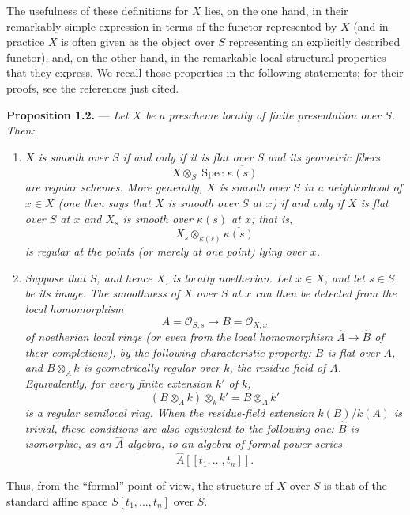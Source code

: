 The usefulness of these definitions for \(X\) lies, on the one hand,
in their remarkably simple expression in terms of the functor
represented by \(X\) (and in practice \(X\) is often given as the
object over \(S\) representing an explicitly described functor), and,
on the other hand, in the remarkable local structural properties that
they express.  We recall those properties in the following statements;
for their proofs, see the references just cited.

\medskip
\noindent{}\textbf{Proposition 1.2.} ---
\textit{Let \(X\) be a prescheme locally of finite presentation over
\(S\).  Then:}

\begin{enumerate}
\item[(i)]  \textit{\(X\) is smooth over \(S\) if and only if it is flat
over \(S\) and its geometric fibers
\[
  X\otimes_S\operatorname{Spec}\overline{\kappa(s)}
\]
are regular schemes.  More generally, \(X\) is smooth over \(S\) in a
neighborhood of \(x\in X\) (one then says that \(X\) is smooth over
\(S\) at \(x\)) if and only if \(X\) is flat over \(S\) at \(x\) and
\(X_s\) is smooth over \(\kappa(s)\) at \(x\); that is,
\[
  X_s\otimes_{\kappa(s)}\overline{\kappa(s)}
\]
is regular at the points (or merely at one point) lying over \(x\).}

\item[(ii)]  \textit{Suppose that \(S\), and hence \(X\), is locally
noetherian.  Let \(x\in X\), and let \(s\in S\) be its image.  The
smoothness of \(X\) over \(S\) at \(x\) can then be detected from the
local homomorphism
\[
  A=\mathscr O_{S,s}\longrightarrow B=\mathscr O_{X,x}
\]
of noetherian local rings (or even from the local homomorphism
\(\widehat A\to\widehat B\) of their completions), by the following
characteristic property: \(B\) is flat over \(A\), and
\(B\otimes_A k\) is geometrically regular over \(k\), the residue
field of \(A\).  Equivalently, for every finite extension \(k'\) of
\(k\),
\[
  (B\otimes_A k)\otimes_k k'=B\otimes_A k'
\]
is a regular semilocal ring.  When the residue-field extension
\(k(B)/k(A)\) is trivial, these conditions are also equivalent to the
following one: \(\widehat B\) is isomorphic, as an
\(\widehat A\)-algebra, to an algebra of formal power series
\[
  \widehat A[[t_1,\ldots,t_n]].
\]}
\end{enumerate}

Thus, from the ``formal'' point of view, the structure of \(X\) over
\(S\) is that of the standard affine space \(S[t_1,\ldots,t_n]\) over
\(S\).

